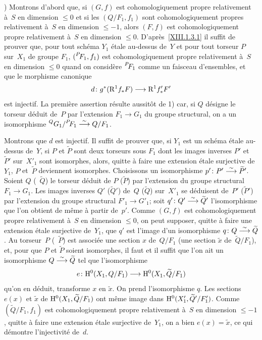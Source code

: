 ) Montrons d'abord que, si $(G,f)$ est cohomologiquement
propre relativement \`a~$S$ en dimension $\leqslant 0$ et si les
$(Q/F_1, f_1)$ sont cohomologiquement
propres relativement \`a~$S$ en dimension $\leqslant -1$, alors
$(F,f)$ est cohomologiquement propre relativement \`a~$S$ en
dimension $\leqslant 0$. D'apr\`es~\ref{XIII.1.3.1} il suffit de
prouver que, pour tout sch\'ema $Y_1$ \'etale au-dessus de~$Y$ et
pour tout torseur $P$ sur~$X_1$ de groupe $F_1$, $(\leftexp{P\mkern-4mu}{F}_1,
f_1)$ est cohomologiquement propre relativement \`a~$S$ en dimension
$\leqslant 0$ quand on consid\`ere $\leftexp{P\mkern-4mu}{F}_1$ comme un
faisceau d'ensembles, et que le morphisme canonique
$$
d \colon g^*(\R^1 f_* F) \to \R^1 f'_* F'
$$
est injectif. La premi\`ere assertion r\'esulte aussit\^ot de 1)
car, si $Q$ d\'esigne le torseur d\'eduit de~$P$ par l'extension
$F_1 \to G_1$ du groupe structural, on a un isomorphisme
$\leftexp{Q}{G}_1 / \leftexp{P\mkern-4mu}{F}_1 \isomto Q/F_1$.

Montrons que $d$ est injectif. Il suffit de prouver que, si $Y_1$ est
un sch\'ema \'etale au-dessus de~$Y$, si $P$ et $\tilde{P}$ sont
deux torseurs sous $F_1$ dont les images inverses $P'$ et~$\tilde{P}'$
sur~$X'_1$ sont isomorphes, alors, quitte \`a faire une extension
\'etale surjective de~$Y_1$, $P$ et~$\tilde{P}$ deviennent
isomorphes. Choisissons un isomorphisme $p' \colon P' \overset{\sim}{\longrightarrow}
\widetilde{P}'$. Soient $Q$ (\resp~$\tilde{Q}$) le torseur d\'eduit de
$P$ (\resp $\tilde{P}$) par l'extension du groupe structural $F_1 \to
G_1$. Les images inverses $Q'$ (\resp $\tilde{Q}'$) de~$Q$
(\resp $\tilde{Q}$) sur~$X'_1$ se d\'eduisent de~$P'$
(\resp $\tilde{P}'$) par
l'extension
du groupe structural $F'_1 \to G'_1$; soit $q' \colon Q' \overset{\sim}{\longrightarrow}
\widetilde{Q}'$ l'isomorphisme que l'on obtient de m\^eme \`a partir
de~$p'$. Comme $(G,f)$ est cohomologiquement propre relativement \`a~$S$ en dimension $\leqslant 0$, on peut supposer, quitte \`a faire
une extension \'etale surjective de~$Y_1$, que $q'$ est l'image d'un
isomorphisme $q \colon Q \overset{\sim}{\longrightarrow} \widetilde{Q}$. Au torseur~$P$
(\resp~$\tilde{P}$) est associ\'ee une section $x$ de~$Q/F_1$
(\resp une section $\tilde{x}$ de~$\tilde{Q}/F_1$), et, pour que $P$
et $\tilde{P}$ soient isomorphes, il faut et il suffit que l'on ait un
isomorphisme $Q \overset{\sim}{\longrightarrow} \widetilde{Q}$ tel que l'isomorphisme
$$
e \colon \H^0(X_1, Q/F_1) \to \H^0(X_1,\tilde{Q}/F_1)
$$
qu'on en d\'eduit, transforme $x$ en $\tilde{x}$. On prend
l'isomorphisme $q$. Les sections $e(x)$ et $\tilde{x}$ de
$\mathrm{H}^0(X_1,\widetilde{Q}/F_1)$ ont m\^eme image dans
$\mathrm{H}^0(X'_1,\widetilde{Q}'/F'_1)$. Comme $(\tilde{Q}/F_1,f_1)$ est
cohomologiquement propre relativement \`a~$S$ en dimension
$\leqslant -1$,
quitte \`a faire une extension \'etale surjective de~$Y_1$, on a
bien $e(x) = \tilde{x}$, ce qui d\'emontre l'injectivit\'e de~$d$.

